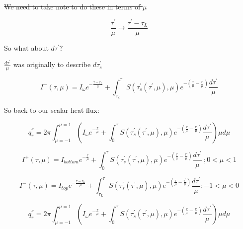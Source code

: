 \documentclass[12pt]{article}
\renewcommand{\_}{\kern-1.5pt\textunderscore\kern-1.5pt}
\begin{document}
\vspace{\baselineskip}
\sout{We need to take note to do these in terms of  \(  \mu  \) }\par

 \[ \frac{ \tau^{'}}{ \mu } \rightarrow \frac{ \tau^{'}- \tau_{L}}{ \mu } \] \par

So what about  \( d \tau^{'}? \) \par

 \( \frac{d \tau^{'}}{ \mu } \)  was originally to describe  \( d \tau_{s}^{'} \) \par

 \[ I^{-} \left(  \tau, \mu  \right) =I_{ \omega }e^{-\frac{ \tau- \tau_{L}}{ \mu }}+ \int _{ \tau_{L}}^{ \tau}S \left(  \tau_{s}^{'} \left(  \tau^{'}, \mu  \right) , \mu  \right) e^{- \left( \frac{ \tau}{ \mu }-\frac{ \tau^{'}}{ \mu } \right) }\frac{d \tau^{'}}{ \mu } \] \par

\par

So back to our scalar heat flux:\par

 \[ q_{r}^{''}=2 \pi  \int _{ \mu =-1}^{ \mu =1} \left( I_{ \omega }e^{-\frac{ \tau}{ \mu }}+ \int _{0}^{ \tau}S \left(  \tau_{s}^{'} \left(  \tau^{'}, \mu  \right) , \mu  \right) e^{- \left( \frac{ \tau}{ \mu }-\frac{ \tau'}{ \mu } \right) }\frac{d \tau^{'}}{ \mu } \right)   \mu  d \mu  \] \par

 \[ I^{+} \left(  \tau, \mu  \right) =I_{bottom}e^{-\frac{ \tau}{ \mu }}+ \int _{0}^{ \tau}S \left(  \tau_{s}^{'} \left(  \tau^{'}, \mu  \right) , \mu  \right) e^{- \left( \frac{ \tau}{ \mu }-\frac{ \tau'}{ \mu } \right) }\frac{d \tau^{'}}{ \mu }~;  0< \mu <1 \] \par

 \[ I^{-} \left(  \tau, \mu  \right) =I_{top}e^{-\frac{ \tau- \tau_{L}}{ \mu }}+ \int _{ \tau_{L}}^{ \tau}S \left(  \tau_{s}^{'} \left(  \tau^{'}, \mu  \right) , \mu  \right) e^{- \left( \frac{ \tau}{ \mu }-\frac{ \tau^{'}}{ \mu } \right) }\frac{d \tau^{'}}{ \mu } ; -1< \mu <0 \] \par

 \[ q_{r}^{''}=2 \pi  \int _{ \mu =-1}^{ \mu =1} \left( I_{ \omega }e^{-\frac{ \tau}{ \mu }}+ \int _{0}^{ \tau}S \left(  \tau_{s}^{'} \left(  \tau^{'}, \mu  \right) , \mu  \right) e^{- \left( \frac{ \tau}{ \mu }-\frac{ \tau'}{ \mu } \right) }\frac{d \tau^{'}}{ \mu } \right)   \mu  d \mu  \] \par
\end{document}
